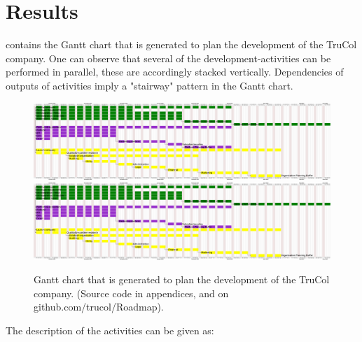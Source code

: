 \section{Results}\label{sec:results}
%
 contains the Gantt chart that is generated to plan the development of the TruCol company. One can observe that several of the development-activities can be performed in parallel, these are accordingly stacked vertically. Dependencies of outputs of activities imply a "stairway" pattern in the Gantt chart.
\clearpage
\begin{figure}
\hspace*{-0cm}
	\ifx\homepath\overleafhome
		\includegraphics[width=775pt]{Images/Diagrams/gantt.png}
	\else
		\includegraphics[width=775pt]{latex/Images/Diagrams/gantt.png}
	\fi
    \caption{Gantt chart that is generated to plan the development of the TruCol company. (Source code in appendices, and on github.com/trucol/Roadmap).}
    \label{fig:gantt}
\end{figure}
\clearpage
The description of the activities can be given as:
